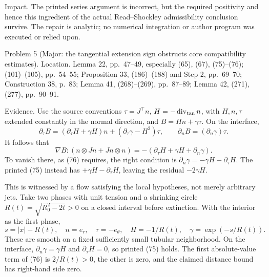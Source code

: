 \documentclass[10pt]{article}
\begin{document}
Impact. The printed series argument is incorrect, but the required positivity and hence this ingredient of the actual Read–Shockley admissibility conclusion survive. The repair is analytic; no numerical integration or author program was executed or relied upon.\par
Problem 5 (Major: the tangential extension sign obstructs core compatibility estimates).  Location. Lemma 22, pp. 47–49, especially (65), (67), (75)–(76); (101)–(105), pp. 54–55; Proposition 33, (186)–(188) and Step 2, pp. 69–70; Construction 38, p. 83; Lemma 41, (268)–(269), pp. 87–89; Lemma 42, (271), (277), pp. 90–91.\par
Evidence. Use the source conventions \(\tau=J^\top n\), \(H=-\operatorname{div}_{\rm tan}n\), with \(H,n,\tau\) extended constantly in the normal direction, and \(B=Hn+\gamma\tau\). On the interface, \[\partial_\tau B=(\partial_\tau H+\gamma H)n
                  +(\partial_\tau\gamma-H^2)\tau,\qquad
 \partial_nB=(\partial_n\gamma)\tau .\] It follows that \[\nabla B:(n\otimes Jn+Jn\otimes n)
 =-(\partial_\tau H+\gamma H+\partial_n\gamma).                 \tag{2.5}\] To vanish there, as (76) requires, the right condition is \(\partial_n\gamma=-\gamma H-\partial_\tau H\). The printed (75) instead has \(+\gamma H-\partial_\tau H\), leaving the residual \(-2\gamma H\).\par
This is witnessed by a flow satisfying the local hypotheses, not merely arbitrary jets. Take two phases with unit tension and a shrinking circle \(R(t)=\sqrt{R_0^2-2t}>0\) on a closed interval before extinction. With the interior as the first phase, \[s=|x|-R(t),\quad n=e_r,\quad \tau=-e_\theta,\quad
 H=-1/R(t),\quad \gamma=\exp(-s/R(t)).\] These are smooth on a fixed sufficiently small tubular neighborhood. On the interface, \(\partial_n\gamma=\gamma H\) and \(\partial_\tau H=0\), so printed (75) holds. The first absolute-value term of (76) is \(2/R(t)>0\), the other is zero, and the claimed distance bound has right-hand side zero.\par
\end{document}
